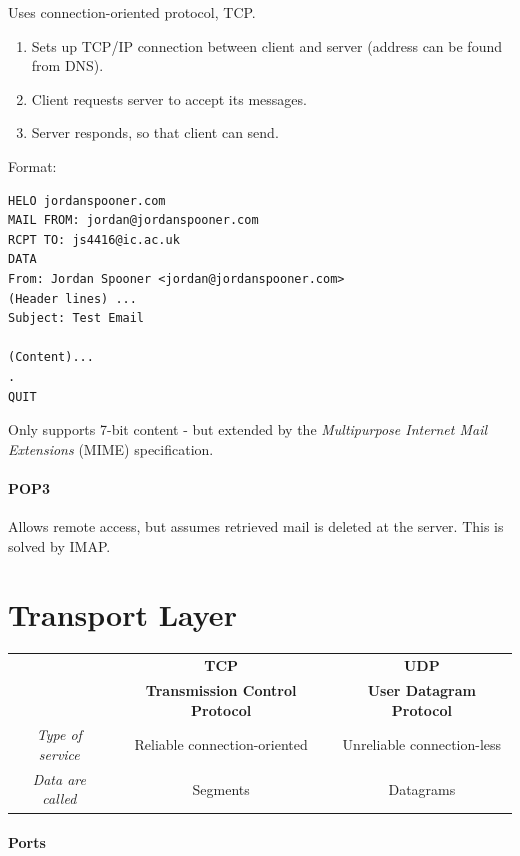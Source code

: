 \documentclass[twocolumn,english]{article}
\providecommand{\tabularnewline}{\\}
\providecommand{\tabularnewline}{\\}
\begin{document}
Uses connection-oriented protocol, TCP.
\begin{enumerate}
\item Sets up TCP/IP connection between client and server (address can be
found from DNS).
\item Client requests server to accept its messages.
\item Server responds, so that client can send.
\end{enumerate}
Format:

\begin{lstlisting}
HELO jordanspooner.com
MAIL FROM: jordan@jordanspooner.com
RCPT TO: js4416@ic.ac.uk
DATA
From: Jordan Spooner <jordan@jordanspooner.com>
(Header lines) ...
Subject: Test Email

(Content)...
.
QUIT
\end{lstlisting}

Only supports 7-bit content - but extended by the \emph{Multipurpose
Internet Mail Extensions} (MIME) specification.

\paragraph{POP3}

Allows remote access, but assumes retrieved mail is deleted at the
server. This is solved by IMAP.

\section{Transport Layer}

\begin{table}[H]
\centering{}%
\begin{tabular}{ccc}
\toprule 
 & \textbf{\footnotesize{}TCP} & \textbf{\footnotesize{}UDP}\tabularnewline
 & \textbf{\footnotesize{}Transmission Control Protocol} & \textbf{\footnotesize{}User Datagram Protocol}\tabularnewline
\midrule
\emph{\footnotesize{}Type of service} & {\footnotesize{}Reliable connection-oriented} & {\footnotesize{}Unreliable connection-less}\tabularnewline
\emph{\footnotesize{}Data are called} & {\footnotesize{}Segments} & {\footnotesize{}Datagrams}\tabularnewline
\bottomrule
\end{tabular}
\end{table}

\paragraph{Ports}
\end{document}
